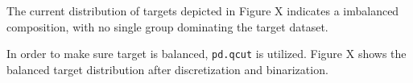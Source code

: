 The current distribution of targets depicted in Figure X indicates a imbalanced composition, with no single group dominating the target dataset.

In order to make sure target is balanced, \texttt{pd.qcut} is utilized. Figure X shows the balanced target distribution after discretization and binarization.








